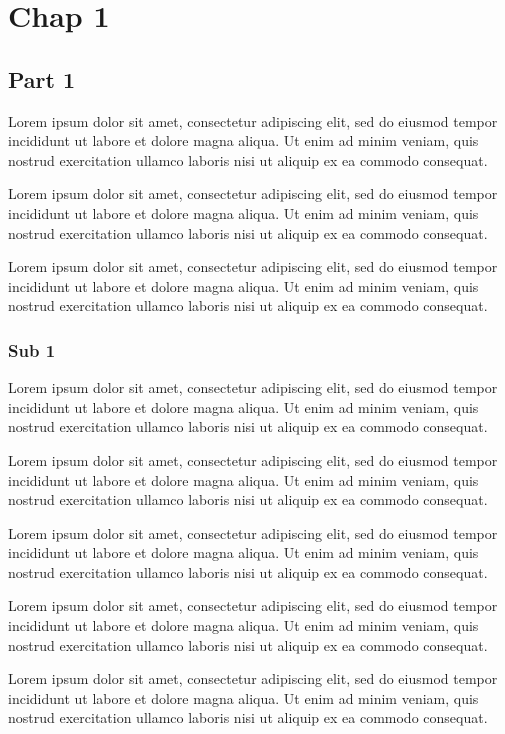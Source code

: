 \documentclass{report}
\begin{document}
\tableofcontents
\chapter{Chap 1}
\section{Part 1}
Lorem ipsum dolor sit amet, consectetur adipiscing elit, sed do eiusmod tempor incididunt ut labore et dolore magna aliqua. Ut enim ad minim veniam, quis nostrud exercitation ullamco laboris nisi ut aliquip ex ea commodo consequat.

Lorem ipsum dolor sit amet, consectetur adipiscing elit, sed do eiusmod tempor incididunt ut labore et dolore magna aliqua. Ut enim ad minim veniam, quis nostrud exercitation ullamco laboris nisi ut aliquip ex ea commodo consequat.

Lorem ipsum dolor sit amet, consectetur adipiscing elit, sed do eiusmod tempor incididunt ut labore et dolore magna aliqua. Ut enim ad minim veniam, quis nostrud exercitation ullamco laboris nisi ut aliquip ex ea commodo consequat.

\subsection{Sub 1}
Lorem ipsum dolor sit amet, consectetur adipiscing elit, sed do eiusmod tempor incididunt ut labore et dolore magna aliqua. Ut enim ad minim veniam, quis nostrud exercitation ullamco laboris nisi ut aliquip ex ea commodo consequat.

Lorem ipsum dolor sit amet, consectetur adipiscing elit, sed do eiusmod tempor incididunt ut labore et dolore magna aliqua. Ut enim ad minim veniam, quis nostrud exercitation ullamco laboris nisi ut aliquip ex ea commodo consequat.

Lorem ipsum dolor sit amet, consectetur adipiscing elit, sed do eiusmod tempor incididunt ut labore et dolore magna aliqua. Ut enim ad minim veniam, quis nostrud exercitation ullamco laboris nisi ut aliquip ex ea commodo consequat.

Lorem ipsum dolor sit amet, consectetur adipiscing elit, sed do eiusmod tempor incididunt ut labore et dolore magna aliqua. Ut enim ad minim veniam, quis nostrud exercitation ullamco laboris nisi ut aliquip ex ea commodo consequat.

Lorem ipsum dolor sit amet, consectetur adipiscing elit, sed do eiusmod tempor incididunt ut labore et dolore magna aliqua. Ut enim ad minim veniam, quis nostrud exercitation ullamco laboris nisi ut aliquip ex ea commodo consequat.
\end{document}
